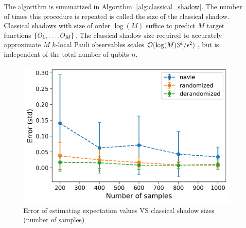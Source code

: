 \documentclass[
aps,
pra,
twocolumn,
floatfix,
]{revtex4-2}
\theoremstyle{plain}
\newtheorem{theorem}{Theorem}
\newtheorem{lemma}{Lemma}
\theoremstyle{definition}
\newcommand{\ob}{O}
\newcommand{\dm}{\rho}
\newcommand{\shadow}{\textup{shadow}}
\begin{document}
The algorithm is summarized in Algorithm. \ref{alg:classical_shadow}.
The number of times this procedure is repeated is called the size of the classical shadow. 
Classical shadows with size of order $\log(M)$ suffice to predict $M$ target functions $\qty{\ob_1,\dots,\ob_M}$.
The classical shadow size required to accurately approximate $M$ $k$-local Pauli observables scales $\mathcal{O}(\log(M) 3^k/\epsilon^2)$ \cite{huangPredictingManyProperties2020}, but is independent of the total number of qubits $n$.
\begin{figure}[!ht]
	\centering
	\includegraphics[width=.9\linewidth]{./Code/estimation_error_compare_methods.png}
	\caption{Error of estimating expectation values VS classical shadow sizes (number of samples)}
	\label{fig:shadow}
\end{figure}
\end{document}
